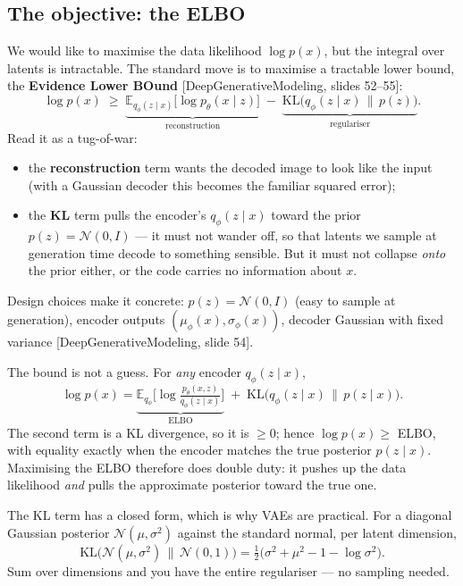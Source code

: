 \documentclass[11pt]{article}
\newcommand{\E}{\mathbb{E}}
\newcommand{\KL}{\mathrm{KL}}
\newcommand{\deck}[1]{\textsf{\small[#1]}}
\begin{document}
\subsection{The objective: the ELBO}

We would like to maximise the data likelihood $\log p(x)$, but the integral over
latents is intractable. The standard move is to maximise a tractable lower bound,
the \textbf{Evidence Lower BOund} \deck{DeepGenerativeModeling, slides 52--55}:
\[
\log p(x) \;\ge\; \underbrace{\E_{q_\phi(z\mid x)}\!\big[\log p_\theta(x\mid z)\big]}_{\text{reconstruction}}
\;-\; \underbrace{\KL\!\big(q_\phi(z\mid x)\,\|\,p(z)\big)}_{\text{regulariser}} .
\]
Read it as a tug-of-war:
\begin{itemize}[nosep,leftmargin=*]
  \item the \textbf{reconstruction} term wants the decoded image to look like the
  input (with a Gaussian decoder this becomes the familiar squared error);
  \item the \textbf{KL} term pulls the encoder's $q_\phi(z\mid x)$ toward the
  prior $p(z)=\mathcal{N}(0,I)$ --- it must not wander off, so that latents we
  sample at generation time decode to something sensible. But it must not collapse
  \emph{onto} the prior either, or the code carries no information about $x$.
\end{itemize}
Design choices make it concrete: $p(z)=\mathcal{N}(0,I)$ (easy to sample at
generation), encoder outputs $(\mu_\phi(x),\sigma_\phi(x))$, decoder Gaussian with
fixed variance \deck{DeepGenerativeModeling, slide 54}.

\begin{notebox}
The bound is not a guess. For \emph{any} encoder $q_\phi(z\mid x)$,
\[
\log p(x)=\underbrace{\E_{q_\phi}\!\Big[\log\tfrac{p_\theta(x,z)}{q_\phi(z\mid x)}\Big]}_{\text{ELBO}}
   \;+\; \KL\!\big(q_\phi(z\mid x)\,\|\,p(z\mid x)\big).
\]
The second term is a KL divergence, so it is $\ge 0$; hence $\log p(x)\ge$ ELBO,
with equality exactly when the encoder matches the true posterior $p(z\mid x)$.
Maximising the ELBO therefore does double duty: it pushes up the data likelihood
\emph{and} pulls the approximate posterior toward the true one.
\end{notebox}

\begin{notebox}
The KL term has a closed form, which is why VAEs are practical. For a diagonal
Gaussian posterior $\mathcal{N}(\mu,\sigma^2)$ against the standard normal,
per latent dimension,
\[
\KL\!\big(\mathcal{N}(\mu,\sigma^2)\,\|\,\mathcal{N}(0,1)\big)
   = \tfrac12\big(\sigma^2 + \mu^2 - 1 - \log\sigma^2\big).
\]
Sum over dimensions and you have the entire regulariser --- no sampling needed.
\end{notebox}
\end{document}
